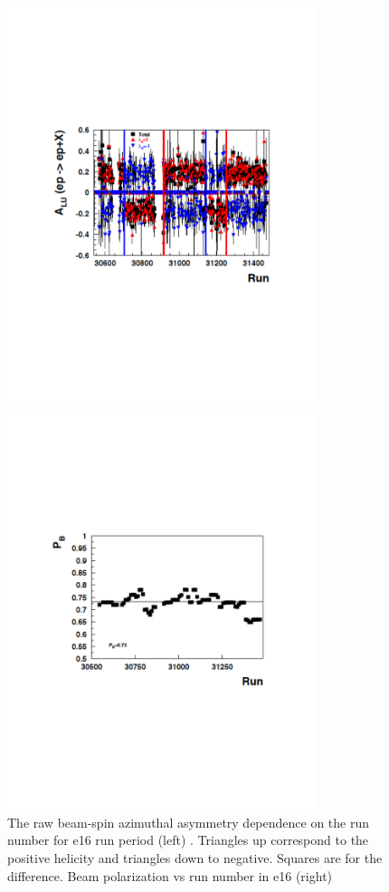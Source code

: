 \documentclass[11pt,a4paper]{article}
\begin{document}
\begin{figure}[hptb]
\begin{minipage}{.6\textwidth}
\includegraphics[width=9cm]{plots/dvcsalupass2nt21c.pdf}
\end{minipage}
\begin{minipage}{.6\textwidth}
\includegraphics[width=9cm]{plots/e16beampol.pdf}
\end{minipage}
   \caption{ The raw beam-spin azimuthal asymmetry  dependence on the run number
for e16  run period (left) . Triangles up correspond to the positive helicity and triangles 
down to negative. Squares are for the difference. Beam polarization vs run number in e16 (right)}
 \label{fig:dvcsalupass2nt21c}
\end{figure}
\end{document}
